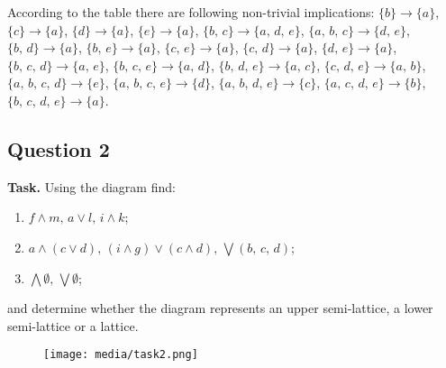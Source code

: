 \documentclass[14pt,a4paper]{extarticle}
\begin{document}
	\noindent According to the table there are following non-trivial implications: $\{b\}\rightarrow \{a\}$, $\{c\}\rightarrow \{a\}$, $\{d\}\rightarrow \{a\}$, $\{e\}\rightarrow \{a\}$, $\{b,\, c\}\rightarrow\{a,\, d,\, e\}$, $\{a,\, b,\, c\}\rightarrow\{d,\, e\}$, $\{b,\, d\}\rightarrow \{a\}$, $\{b,\, e\}\rightarrow \{a\}$, $\{c,\, e\}\rightarrow \{a\}$, $\{c,\, d\}\rightarrow \{a\}$, $\{d,\, e\}\rightarrow \{a\}$, $\{b,\, c,\, d\}\rightarrow\{a,\, e\}$, $\{b,\, c,\, e\}\rightarrow\{a,\, d\}$, $\{b,\, d,\, e\}\rightarrow\{a,\, c\}$, $\{c,\, d,\, e\}\rightarrow\{a,\, b\}$, $\{a,\, b,\, c,\, d\}\rightarrow\{e\}$, $\{a,\, b,\, c,\, e\}\rightarrow\{d\}$, $\{a,\, b,\, d,\, e\}\rightarrow\{c\}$, $\{a,\, c,\, d,\, e\}\rightarrow\{b\}$, $\{b,\, c,\, d,\, e\}\rightarrow\{a\}$.
	\newpage
	 
	\subsection*{Question 2}
	 
	\noindent\textbf{Task.} Using the diagram find:
	\begin{enumerate}
		\item $f\land m,\, a\lor l,\, i\land k$;
		\item $a\land(c\lor d),\, (i\land g)\lor(c\land d),\, \bigvee(b,\, c,\, d)$;
		\item $\bigwedge \emptyset,\, \bigvee \emptyset$;
	\end{enumerate}
	and determine whether the diagram represents an upper semi-lattice, a lower semi-lattice or a lattice.
	 
	\begin{figure}[h]
		\texttt{[image: media/task2.png]}
		\centering
	\end{figure}
	 
\end{document}
